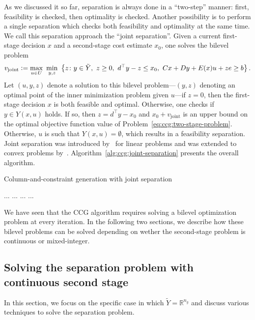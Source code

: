 As we discussed it so far, separation is always done in a ``two-step'' manner:
first, feasibility is checked, then optimality is checked. Another possibility
is to perform a single separation which checks both feasibility and optimality
at the same time. We call this separation approach the ``joint separation''.
Given a current first-stage decision $x$ and a second-stage cost estimate
$x_0$, one solves the bilevel problem 
\begin{equation*}
    v_\text{joint} \mathrel{{\mathop:}{=}} \max_{u\in U} \ \min_{y,z} \ \left\{ z \colon y\in\tilde{Y}, \ z \ge 0, \ d^\top y - z \le x_0, \ Cx + Dy + E(x)u + ze \ge b \right\}.
\end{equation*}
Let $(u,y,z)$ denote a solution to this bilevel problem---$(y,z)$ denoting an
optimal point of the inner minimization problem given $u$---if $z = 0$, then
the first-stage decision $x$ is both feasible and optimal. Otherwise, one
checks if $y\in Y(x,u)$ holds. If so, then $z = d^\top y - x_0$ and $x_0 +
v_\text{joint}$ is an upper bound on the optimal objective function value of
Problem~\eqref{eq:ccg:two-stage-problem}. Otherwise, $u$ is such that $Y(x,u)
= \emptyset$, which results in a feasibility separation. Joint separation was
introduced by~\textcite{Ayoub2016} for linear problems and was extended to
convex problems by~\textcite{lefebvre2022convex}.
Algorithm~\ref{alg:ccg:joint-separation} presents the overall algorithm.

\begin{algorithm}
    \caption{Column-and-constraint generation with joint separation}
    \label{alg:ccg:joint-separation}
    \begin{algorithmic}[1]
        \State ...
        \While {}
        \State ...
            \State ... 
        \EndIf
        \State ...
        \EndWhile
    \end{algorithmic}
\end{algorithm}

We have seen that the CCG algorithm requires solving a bilevel optimization
problem at every iteration. In the following two sections, we describe how
these bilevel problems can be solved depending on wether the second-stage
problem is continuous or mixed-integer. 

\subsection{Solving the separation problem with continuous second stage}

In this section, we focus on the specific case in which $\tilde{Y} =
\mathbb{R}^{n_y}$ and discuss various techniques to solve the separation
problem. 

